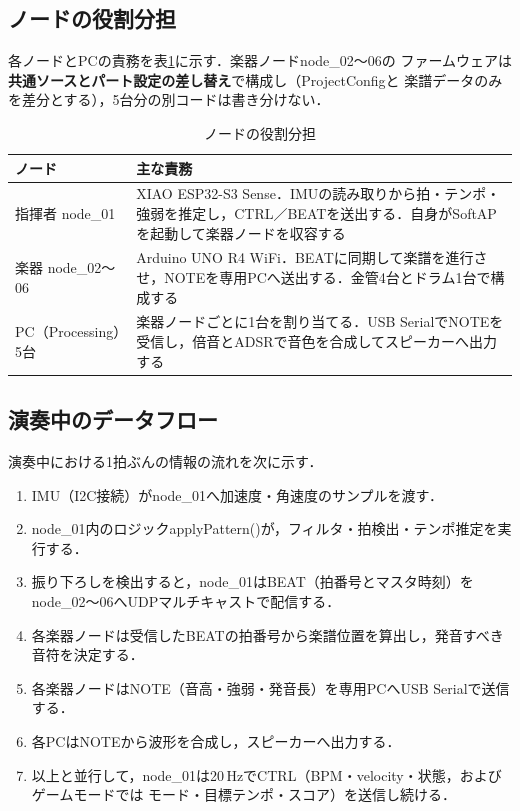 \documentclass[lualatex,book,paper=a4paper,jafontsize=11.5pt,jafontscale=1.05]{jlreq}
\begin{document}
\subsection{ノードの役割分担}
各ノードとPCの責務を表\ref{tab:node-roles}に示す．楽器ノードnode\_02〜06の
ファームウェアは\textbf{共通ソースとパート設定の差し替え}で構成し（ProjectConfigと
楽譜データのみを差分とする），5台分の別コードは書き分けない．
\begin{table}[H]\centering
  \caption{ノードの役割分担}\label{tab:node-roles}
  \small
  \begin{tabularx}{\linewidth}{>{\raggedright\arraybackslash}p{2.6cm} X}
    \toprule
    ノード & 主な責務 \\
    \midrule
    指揮者 node\_01 & XIAO ESP32-S3 Sense．IMUの読み取りから拍・テンポ・強弱を推定し，CTRL／BEATを送出する．自身がSoftAPを起動して楽器ノードを収容する \\
    楽器 node\_02〜06 & Arduino UNO R4 WiFi．BEATに同期して楽譜を進行させ，NOTEを専用PCへ送出する．金管4台とドラム1台で構成する \\
    PC（Processing）5台 & 楽器ノードごとに1台を割り当てる．USB SerialでNOTEを受信し，倍音とADSRで音色を合成してスピーカーへ出力する \\
    \bottomrule
  \end{tabularx}
\end{table}

\subsection{演奏中のデータフロー}
演奏中における1拍ぶんの情報の流れを次に示す．
\begin{enumerate}[leftmargin=2.2em, itemsep=2pt]
  \item IMU（I2C接続）がnode\_01へ加速度・角速度のサンプルを渡す．
  \item node\_01内のロジックapplyPattern()が，フィルタ・拍検出・テンポ推定を実行する．
  \item 振り下ろしを検出すると，node\_01はBEAT（拍番号とマスタ時刻）を
        node\_02〜06へUDPマルチキャストで配信する．
  \item 各楽器ノードは受信したBEATの拍番号から楽譜位置を算出し，発音すべき音符を決定する．
  \item 各楽器ノードはNOTE（音高・強弱・発音長）を専用PCへUSB Serialで送信する．
  \item 各PCはNOTEから波形を合成し，スピーカーへ出力する．
  \item 以上と並行して，node\_01は20\,HzでCTRL（BPM・velocity・状態，およびゲームモードでは
        モード・目標テンポ・スコア）を送信し続ける．
\end{enumerate}
\end{document}
